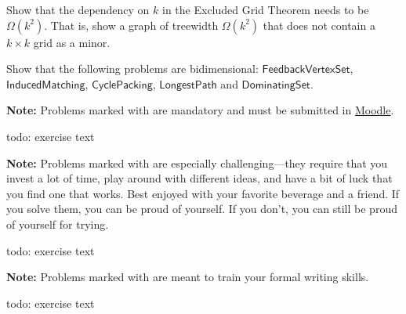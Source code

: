 \documentclass{uebung_cs}
\begin{document}
\begin{exercise}
Show that the dependency on $k$ in the Excluded Grid Theorem needs to be $\Omega(k^2)$. That is, show a graph of treewidth $\Omega(k^2)$ that does not contain a $k \times k$ grid as a minor.
\end{exercise}

\begin{exercise}
Show that the following problems are bidimensional: $\mathsf{FeedbackVertexSet}$, $\mathsf{InducedMatching}$, $\mathsf{CyclePacking}$, $\mathsf{LongestPath}$ and $\mathsf{DominatingSet}$.
\end{exercise}


\textbf{Note:} Problems marked with \mandatory are mandatory and must be submitted in \href{https://moodle.studiumdigitale.uni-frankfurt.de/moodle/course/view.php?id=6259}{Moodle}.

\begin{exercise}
  todo: exercise text
\end{exercise}

\textbf{Note:} Problems marked with \hard are especially challenging---they require that you invest a lot of time, play around with different ideas, and have a bit of luck that you find one that works. Best enjoyed with your favorite beverage and a friend. If you solve them, you can be proud of yourself. If you don't, you can still be proud of yourself for trying.

\begin{exercise}
  todo: exercise text
\end{exercise}

\newpage
\textbf{Note:} Problems marked with \schriftlich are meant to train your formal writing skills.

\begin{exercise}
  todo: exercise text
\end{exercise}
\end{document}
